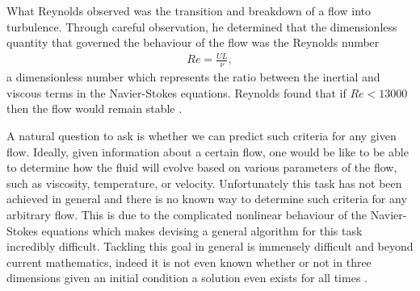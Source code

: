 What Reynolds observed was the transition and breakdown of a flow into turbulence. Through careful observation, he determined that the dimensionless quantity that governed the behaviour of the flow was the Reynolds number 
\begin{align}
Re =\frac{UL}{\nu},
\end{align}
a dimensionless number which represents the ratio between the inertial and viscous terms in the Navier-Stokes equations. Reynolds found that if $Re<13000$ then the flow would remain stable \cite{reynolds1883}.

A natural question to ask is whether we can predict such criteria for any given flow. Ideally, given information about a certain flow, one would be like to be able to determine how the fluid will evolve based on various parameters of the flow, such as viscosity, temperature, or velocity. Unfortunately this task has not been achieved in general and there is no known way to determine such criteria for any arbitrary flow.  This is due to the complicated nonlinear behaviour of the Navier-Stokes equations which makes devising a general algorithm for this task incredibly difficult. Tackling this goal in general is immensely difficult and beyond current mathematics, indeed it is not even known whether or not in three dimensions given an initial condition a solution even exists for all times \cite{mill}.

